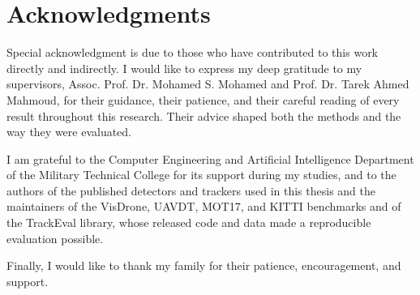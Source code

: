 \chapter*{Acknowledgments}

Special acknowledgment is due to those who have contributed to this work directly and indirectly. I would like to express my deep gratitude to my supervisors, Assoc. Prof. Dr. Mohamed S. Mohamed and Prof. Dr. Tarek Ahmed Mahmoud, for their guidance, their patience, and their careful reading of every result throughout this research. Their advice shaped both the methods and the way they were evaluated.

I am grateful to the Computer Engineering and Artificial Intelligence Department of the Military Technical College for its support during my studies, and to the authors of the published detectors and trackers used in this thesis and the maintainers of the VisDrone, UAVDT, MOT17, and KITTI benchmarks and of the TrackEval library, whose released code and data made a reproducible evaluation possible.

Finally, I would like to thank my family for their patience, encouragement, and support.
